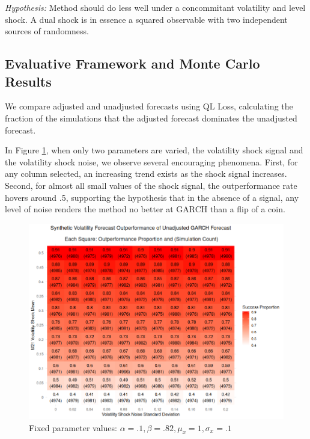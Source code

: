 \documentclass[11pt,3p,review,authoryear]{elsarticle}
\theoremstyle{definition}
\begin{document}
\textit{Hypothesis:} Method should do less well under a concommitant volatility and level shock.  A dual shock is in essence a squared observable with two independent sources of randomness.

\subsection{Evaluative Framework and Monte Carlo Results}
We compare adjusted and unadjusted forecasts using QL Loss, calculating the fraction of the simulations that the adjusted forecast dominates the unadjusted forecast.

In Figure \ref{fig:heavy_beta}, when only two parameters are varied, the volatility shock signal and the volatility shock noise, we observe several encouraging phenomena.  First, for any column selected, an increasing trend exists as the shock signal increases.  Second, for almost all small values of the shock signal, the outperformance rate hovers around .5, supporting the hypothesis that in the absence of a signal, any level of noise renders the method no better at GARCH than a flip of a coin.
\begin{figure}[h!]
  \begin{center}
    \includegraphics[scale=.45]{simulation_plots/standard_simulation_alpha_.1_beta_.82.png}
    \caption{Fixed parameter values: $\alpha = .1, \beta = .82, \mu_{x} = 1, \sigma_{x} = .1$}\label{fig:heavy_beta}
  \end{center}
  \end{figure}
  
\end{document}
